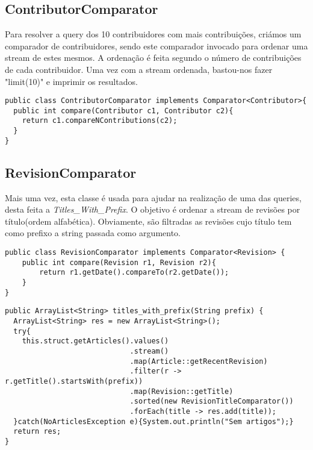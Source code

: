 \documentclass{article}
\begin{document}
\clearpage

\subsection{ContributorComparator}
\par Para resolver a query dos 10 contribuidores com mais contribuições, criámos um comparador de contribuidores, sendo este comparador invocado para ordenar uma stream de estes mesmos. A ordenação é feita segundo o número de contribuições de cada contribuidor. Uma vez com a stream ordenada, bastou-nos fazer "limit(10)" e imprimir os resultados.

\begin{lstlisting}
public class ContributorComparator implements Comparator<Contributor>{
  public int compare(Contributor c1, Contributor c2){
    return c1.compareNContributions(c2);
  }
}
\end{lstlisting}

\subsection{RevisionComparator}
\par Mais uma vez, esta classe é usada para ajudar na realização de uma das queries, desta feita a \emph{Titles\_With\_Prefix}. O objetivo é ordenar a stream de revisões por título(ordem alfabética). Obviamente, são filtradas as revisões cujo título tem como prefixo a string passada como argumento.

\begin{lstlisting}
public class RevisionComparator implements Comparator<Revision> {
    public int compare(Revision r1, Revision r2){
        return r1.getDate().compareTo(r2.getDate());
    }
}
\end{lstlisting}

\begin{lstlisting}
public ArrayList<String> titles_with_prefix(String prefix) {
  ArrayList<String> res = new ArrayList<String>();
  try{
    this.struct.getArticles().values()
    						 .stream()
                             .map(Article::getRecentRevision)
                             .filter(r -> r.getTitle().startsWith(prefix))
                             .map(Revision::getTitle)
                             .sorted(new RevisionTitleComparator())
                             .forEach(title -> res.add(title));
  }catch(NoArticlesException e){System.out.println("Sem artigos");}
  return res;
}
\end{lstlisting}
\end{document}
